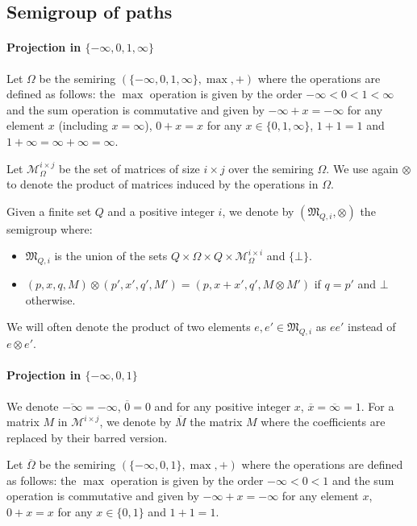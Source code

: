 \documentclass[10pt,a4paper]{amsart}
\theoremstyle{definition}
\numberwithin{equation}{section}
\theoremstyle{remark}
\newcommand{\matrices}[2]{\mathcal{M}^{#1 \times #2}}
\newcommand{\matricesOm}[2]{\mathcal{M}^{#1 \times #2}_\Omega}
\newcommand{\ideal}{\mathfrak{M}}
\theoremstyle{remark}
\begin{document}
\subsection{Semigroup of paths}
\label{sec:semi-group-of-paths}
\paragraph*{Projection in $\{-\infty,0,1,\infty\}$}

Let $\Omega$ be the semiring $\left(\{-\infty,0,1,\infty\}, \max, +\right)$ where the operations are defined as follows: the $\max$ operation is given by the order $-\infty < 0 < 1 < \infty$ and the sum operation is commutative and given by $-\infty + x = -\infty$ for any element $x$ (including $x=\infty$), $0 + x = x$ for any $x \in \{0,1, \infty\}$, $1 + 1 = 1$ and $1 + \infty = \infty + \infty = \infty$.

Let $\matricesOm{i}{j}$ be the set of matrices of size $i \times j$ over the semiring $\Omega$. We use again $\otimes$ to denote the product of matrices induced by the operations in $\Omega$.

Given a finite set $Q$ and a positive integer $i$, we denote by $(\ideal_{Q,i}, \otimes)$ the semigroup where:
\begin{itemize}
\item $\ideal_{Q,i}$ is the union of the sets $Q \times \Omega \times Q \times \matricesOm{i}{i}$ and $\{\bot\}$.
\item $(p,x,q,M)\otimes(p',x',q',M') = (p,x + x',q', M\otimes M')$ if $q = p'$ and $\bot$ otherwise.
\end{itemize}

We will often denote the product of two elements $e,e'\in\ideal_{Q,i}$ as $ee'$ instead of $e\otimes e'$.

\paragraph*{Projection in $\{-\infty,0,1\}$}

We denote $\overline{-\infty}= -\infty$, $\overline{0}= 0$ and for any positive integer $x$, $\overline{x}= \overline{\infty} = 1$. For a matrix $M$ in $\matrices{i}{j}$, we denote by $\overline{M}$ the matrix $M$ where the coefficients are replaced by their barred version.

Let $\overline{\Omega}$ be the semiring $\left(\{-\infty,0,1\}, \max, +\right)$ where the operations are defined as follows: the $\max$ operation is given by the order $-\infty < 0 < 1 $ and the sum operation is commutative and given by $-\infty + x = -\infty$ for any element $x$, $0 + x = x$ for any $x \in \{0,1\}$ and $1 + 1 = 1$.
\end{document}
